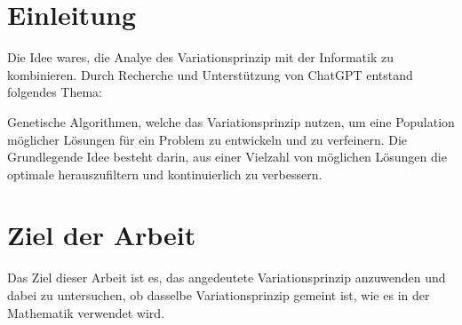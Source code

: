 %
%
%
%
\section{Einleitung
\label{buch:paper:section:introduction}}
Die Idee wares, die Analye des Variationsprinzip mit der Informatik zu kombinieren. 
Durch Recherche und Unterstützung von ChatGPT entstand folgendes Thema:

\begin{displayquote}
    Genetische Algorithmen, welche das Variationsprinzip nutzen, um eine Population 
    möglicher Lösungen für ein Problem zu entwickeln und zu verfeinern. 
    Die Grundlegende Idee besteht darin, aus einer Vielzahl von möglichen Lösungen 
    die optimale herauszufiltern und kontinuierlich zu verbessern.
\end{displayquote}

\section{Ziel der Arbeit
\label{buch:paper:varalg:section:goal}} 
Das Ziel dieser Arbeit ist es, das angedeutete Variationsprinzip anzuwenden und dabei 
zu untersuchen, ob dasselbe Variationsprinzip gemeint ist, wie es in der Mathematik 
verwendet wird.
